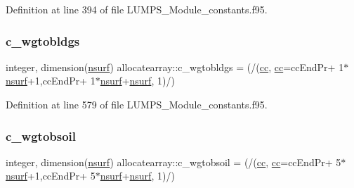 Definition at line 394 of file L\+U\+M\+P\+S\+\_\+\+Module\+\_\+constants.\+f95.

\mbox{\label{namespaceallocatearray_a24a9961978da1f3a08895f0bc9b22c74}} 
\subsubsection{\texorpdfstring{c\+\_\+wgtobldgs}{c\_wgtobldgs}}
{\footnotesize\ttfamily integer, dimension(\hyperlink{namespaceallocatearray_acd22f92a06f7e9a2a91426b3dc99fdb0}{nsurf}) allocatearray\+::c\+\_\+wgtobldgs = (/(\hyperlink{namespaceallocatearray_ac863c81704eb507dee10f5e10741e10c}{cc}, \hyperlink{namespaceallocatearray_ac863c81704eb507dee10f5e10741e10c}{cc}=cc\+End\+Pr+ 1$\ast$\hyperlink{namespaceallocatearray_acd22f92a06f7e9a2a91426b3dc99fdb0}{nsurf}+1,cc\+End\+Pr+ 1$\ast$\hyperlink{namespaceallocatearray_acd22f92a06f7e9a2a91426b3dc99fdb0}{nsurf}+\hyperlink{namespaceallocatearray_acd22f92a06f7e9a2a91426b3dc99fdb0}{nsurf}, 1)/)}



Definition at line 579 of file L\+U\+M\+P\+S\+\_\+\+Module\+\_\+constants.\+f95.

\mbox{\label{namespaceallocatearray_ae0f6317a690754ae6dd059071d328cf0}} 
\subsubsection{\texorpdfstring{c\+\_\+wgtobsoil}{c\_wgtobsoil}}
{\footnotesize\ttfamily integer, dimension(\hyperlink{namespaceallocatearray_acd22f92a06f7e9a2a91426b3dc99fdb0}{nsurf}) allocatearray\+::c\+\_\+wgtobsoil = (/(\hyperlink{namespaceallocatearray_ac863c81704eb507dee10f5e10741e10c}{cc}, \hyperlink{namespaceallocatearray_ac863c81704eb507dee10f5e10741e10c}{cc}=cc\+End\+Pr+ 5$\ast$\hyperlink{namespaceallocatearray_acd22f92a06f7e9a2a91426b3dc99fdb0}{nsurf}+1,cc\+End\+Pr+ 5$\ast$\hyperlink{namespaceallocatearray_acd22f92a06f7e9a2a91426b3dc99fdb0}{nsurf}+\hyperlink{namespaceallocatearray_acd22f92a06f7e9a2a91426b3dc99fdb0}{nsurf}, 1)/)}



